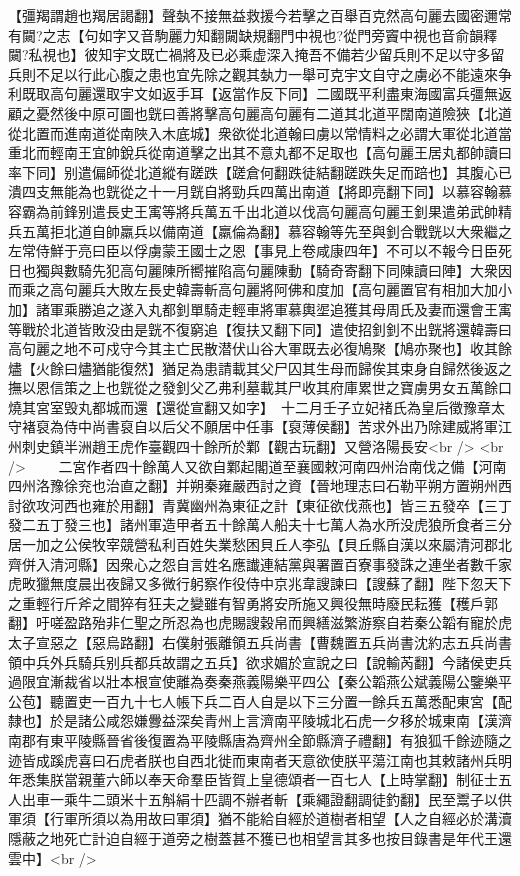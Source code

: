 【彊羯謂趙也羯居謁翻】聲埶不接無益救援今若擊之百舉百克然高句麗去國密邇常有闚?之志【句如字又音駒麗力知翻闚缺規翻門中視也?從門旁竇中視也音俞韻釋闚?私視也】彼知宇文既亡禍將及已必乘虚深入掩吾不備若少留兵則不足以守多留兵則不足以行此心腹之患也宜先除之觀其埶力一舉可克宇文自守之虜必不能遠來争利既取高句麗還取宇文如返手耳【返當作反下同】二國既平利盡東海國富兵彊無返顧之憂然後中原可圖也皝曰善將擊高句麗高句麗有二道其北道平闊南道險狹【北道從北置而進南道從南陜入木底城】衆欲從北道翰曰虜以常情料之必謂大軍從北道當重北而輕南王宜帥銳兵從南道擊之出其不意丸都不足取也【高句麗王居丸都帥讀曰率下同】别遣偏師從北道縱有蹉跌【蹉倉何翻跌徒結翻蹉跌失足而踣也】其腹心已潰四支無能為也皝從之十一月皝自將勁兵四萬出南道【將即亮翻下同】以慕容翰慕容霸為前鋒别遣長史王㝢等將兵萬五千出北道以伐高句麗高句麗王釗果遣弟武帥精兵五萬拒北道自帥羸兵以備南道【羸倫為翻】慕容翰等先至與釗合戰皝以大衆繼之左常侍鮮于亮曰臣以俘虜蒙王國士之恩【事見上卷咸康四年】不可以不報今日臣死日也獨與數騎先犯高句麗陳所嚮摧陷高句麗陳動【騎奇寄翻下同陳讀曰陣】大衆因而乘之高句麗兵大敗左長史韓壽斬高句麗將阿佛和度加【高句麗置官有相加大加小加】諸軍乘勝追之遂入丸都釗單騎走輕車將軍慕輿埿追獲其母周氏及妻而還會王㝢等戰於北道皆敗没由是皝不復窮追【復扶又翻下同】遣使招釗釗不出皝將還韓壽曰高句麗之地不可戍守今其主亡民散潜伏山谷大軍既去必復鳩聚【鳩亦聚也】收其餘燼【火餘曰燼猶能復然】猶足為患請載其父尸囚其生母而歸俟其束身自歸然後返之撫以恩信策之上也皝從之發釗父乙弗利墓載其尸收其府庫累世之寶虜男女五萬餘口燒其宮室毁丸都城而還【還從宣翻又如字】　十二月壬子立妃禇氏為皇后徵豫章太守褚裒為侍中尚書裒自以后父不願居中任事【裒薄侯翻】苦求外出乃除建威將軍江州刺史鎮半洲趙王虎作臺觀四十餘所於鄴【觀古玩翻】又營洛陽長安<br />
<br />
　　二宮作者四十餘萬人又欲自鄴起閣道至襄國敕河南四州治南伐之備【河南四州洛豫徐兖也治直之翻】并朔秦雍嚴西討之資【晉地理志曰石勒平朔方置朔州西討欲攻河西也雍於用翻】青冀幽州為東征之計【東征欲伐燕也】皆三五發卒【三丁發二五丁發三也】諸州軍造甲者五十餘萬人船夫十七萬人為水所没虎狼所食者三分居一加之公侯牧宰競營私利百姓失業愁困貝丘人李弘【貝丘縣自漢以來屬清河郡北齊併入清河縣】因衆心之怨自言姓名應䜟連結黨與署置百寮事發誅之連坐者數千家虎畋獵無度晨出夜歸又多微行躬察作役侍中京兆韋謏諫曰【謏蘇了翻】陛下忽天下之重輕行斤斧之間猝有狂夫之變雖有智勇將安所施又興役無時廢民耘獲【穫戶郭翻】吁嗟盈路殆非仁聖之所忍為也虎賜謏穀帛而興繕滋繁游察自若秦公韜有寵於虎太子宣惡之【惡烏路翻】右僕射張離領五兵尚書【曹魏置五兵尚書沈約志五兵尚書領中兵外兵騎兵别兵都兵故謂之五兵】欲求媚於宣說之曰【說輸芮翻】今諸侯吏兵過限宜漸裁省以壯本根宣使離為奏秦燕義陽樂平四公【秦公韜燕公斌義陽公鑒樂平公苞】聽置吏一百九十七人帳下兵二百人自是以下三分置一餘兵五萬悉配東宮【配隸也】於是諸公咸怨嫌釁益深矣青州上言濟南平陵城北石虎一夕移於城東南【漢濟南郡有東平陵縣晉省後復置為平陵縣唐為齊州全節縣濟子禮翻】有狼狐千餘迹隨之迹皆成蹊虎喜曰石虎者朕也自西北徙而東南者天意欲使朕平蕩江南也其敕諸州兵明年悉集朕當親董六師以奉天命羣臣皆賀上皇德頌者一百七人【上時掌翻】制征士五人出車一乘牛二頭米十五斛絹十匹調不辦者斬【乘繩證翻調徒釣翻】民至鬻子以供軍須【行軍所須以為用故曰軍須】猶不能給自經於道樹者相望【人之自經必於溝瀆隱蔽之地死亡計迫自經于道旁之樹蓋甚不獲已也相望言其多也按目錄書是年代王還雲中】<br />
